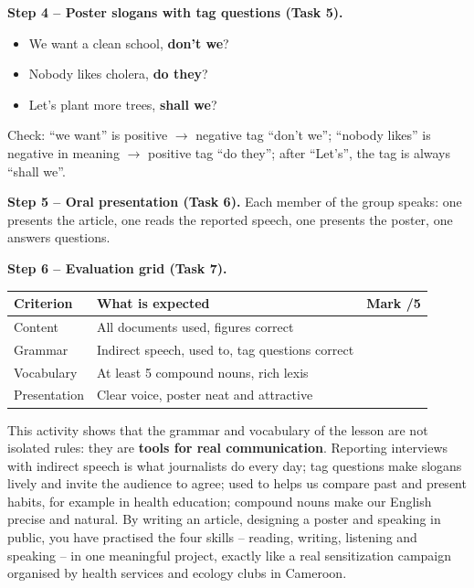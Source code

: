 \documentclass[11pt]{article}
\newcommand{\cle}[1]{{\popxbold\color{popdark}#1}}
\newcounter{popsec}
\newcounter{popsub}
\newcommand{\courssub}[1]{%
  \stepcounter{popsub}%
  \par\vspace{9pt}\noindent{\popxbold\fontsize{11.5}{13}\selectfont\color{popink}{\color{poporange}\thepopsec.\thepopsub}\hspace{6pt}#1}\par\nopagebreak\vspace{4pt}
}
\begin{document}
\begin{exoresolu}
\textbf{Step 4 -- Poster slogans with tag questions (Task 5).}

\begin{itemize}
\item We want a clean school, \textbf{don't we}?
\item Nobody likes cholera, \textbf{do they}?
\item Let's plant more trees, \textbf{shall we}?
\end{itemize}

Check: ``we want'' is positive $\rightarrow$ negative tag ``don't we''; ``nobody likes'' is negative in meaning $\rightarrow$ positive tag ``do they''; after ``Let's'', the tag is always ``shall we''.

\textbf{Step 5 -- Oral presentation (Task 6).} Each member of the group speaks: one presents the article, one reads the reported speech, one presents the poster, one answers questions.

\textbf{Step 6 -- Evaluation grid (Task 7).}

\begin{center}
\begin{tabularx}{\linewidth}{|l|X|c|}\hline
\rowcolor{popgreenL} \textbf{Criterion} & \textbf{What is expected} & \textbf{Mark /5} \\ \hline
Content & All documents used, figures correct & \\ \hline
Grammar & Indirect speech, used to, tag questions correct & \\ \hline
Vocabulary & At least 5 compound nouns, rich lexis & \\ \hline
Presentation & Clear voice, poster neat and attractive & \\ \hline
\end{tabularx}
\end{center}
\end{exoresolu}

\courssub{Bilan de l'activité}

This activity shows that the grammar and vocabulary of the lesson are not isolated rules: they are \textbf{tools for real communication}. Reporting interviews with \cle{indirect speech} is what journalists do every day; \cle{tag questions} make slogans lively and invite the audience to agree; \cle{used to} helps us compare past and present habits, for example in health education; \cle{compound nouns} make our English precise and natural. By writing an article, designing a poster and speaking in public, you have practised the four skills -- reading, writing, listening and speaking -- in one meaningful project, exactly like a real sensitization campaign organised by health services and ecology clubs in Cameroon.
\end{document}
